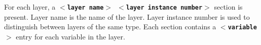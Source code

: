 \documentclass[12pt]{report}
\begin{document}
For each layer, a \textbf{\texttt{\begin{math}<\end{math}layer
name\begin{math}>\end{math} \begin{math}<\end{math}layer
instance number\begin{math}>\end{math}}} section is present. Layer name is the
name of the layer. Layer instance number is used to distinguish between
layers of the same type. Each section contains a
\textbf{\texttt{\begin{math}<\end{math}variable\begin{math}>\end{math}}}
entry for each variable in the layer.
\end{document}
